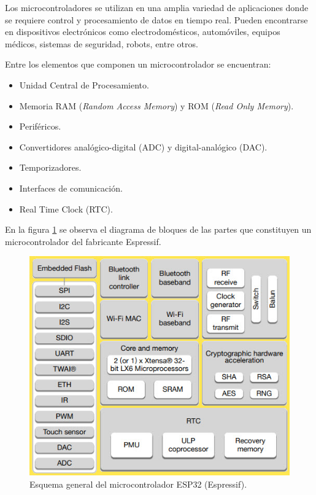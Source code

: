 Los microcontroladores se utilizan en una amplia variedad de aplicaciones donde se requiere control y procesamiento de datos en tiempo real. Pueden encontrarse en dispositivos electrónicos como electrodomésticos, automóviles, equipos médicos, sistemas de seguridad, robots, entre otros.

Entre los elementos que componen un microcontrolador se encuentran:

\begin{itemize}
    \item Unidad Central de Procesamiento.
    \item Memoria RAM (\textit{Random Access Memory}) y ROM (\textit{Read Only Memory}).
    \item Periféricos.
    \item Convertidores analógico-digital (ADC) y digital-analógico (DAC).
    \item Temporizadores.
    \item Interfaces de comunicación.
    \item Real Time Clock (RTC).
\end{itemize}

En la figura \ref{fig:ESP32_Block_Diagram} se observa el diagrama de bloques de las partes que constituyen un microcontrolador del fabricante Espressif.

\begin{figure}[H]
    \centering
    \includegraphics[width = \textwidth]{imagenes/cap1_marcoteo/ESP32-Block-Diagram.jpg}
    \caption{Esquema general del microcontrolador ESP32 (Espressif).}
    \label{fig:ESP32_Block_Diagram}
\end{figure}


